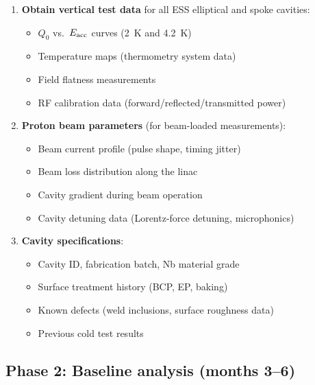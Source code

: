 \documentclass[11pt]{article}
\begin{document}
\begin{enumerate}
\item \textbf{Obtain vertical test data} for all ESS elliptical and
  spoke cavities:
  \begin{itemize}[nosep]
  \item $Q_0$ vs.\ $E_{\rm acc}$ curves (2~K and 4.2~K)
  \item Temperature maps (thermometry system data)
  \item Field flatness measurements
  \item RF calibration data (forward/reflected/transmitted power)
  \end{itemize}

\item \textbf{Proton beam parameters} (for beam-loaded measurements):
  \begin{itemize}[nosep]
  \item Beam current profile (pulse shape, timing jitter)
  \item Beam loss distribution along the linac
  \item Cavity gradient during beam operation
  \item Cavity detuning data (Lorentz-force detuning, microphonics)
  \end{itemize}

\item \textbf{Cavity specifications}:
  \begin{itemize}[nosep]
  \item Cavity ID, fabrication batch, Nb material grade
  \item Surface treatment history (BCP, EP, baking)
  \item Known defects (weld inclusions, surface roughness data)
  \item Previous cold test results
  \end{itemize}
\end{enumerate}

\subsection{Phase 2: Baseline analysis (months 3--6)}
\end{document}
